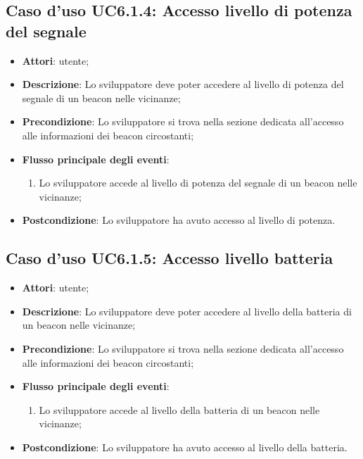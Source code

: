 \documentclass[../AnalisiDeiRequisiti.tex]{subfiles}
\begin{document}
\subsection{Caso d'uso UC6.1.4: Accesso livello di potenza del segnale}
\begin{itemize}
\item \textbf{Attori}: utente;
\item \textbf{Descrizione}: Lo sviluppatore deve poter accedere al livello di potenza del segnale di un beacon nelle vicinanze; 
      \item \textbf{Precondizione}: Lo sviluppatore si trova nella sezione dedicata all'accesso alle informazioni dei beacon circostanti;

        \item \textbf{Flusso principale degli eventi}:
          \begin{enumerate}
          \item Lo sviluppatore accede al livello di potenza del segnale di un beacon nelle vicinanze;

      \end{enumerate}
    \item \textbf{Postcondizione}: Lo sviluppatore ha avuto accesso al livello di potenza.
  \end{itemize}
\hypertarget{UC6.1.5}{}
\subsection{Caso d'uso UC6.1.5: Accesso livello batteria}

\begin{itemize}
\item \textbf{Attori}: utente;
\item \textbf{Descrizione}: Lo sviluppatore deve poter accedere al livello della batteria di un beacon nelle vicinanze; 
      \item \textbf{Precondizione}: Lo sviluppatore si trova nella sezione dedicata all'accesso alle informazioni dei beacon circostanti;

        \item \textbf{Flusso principale degli eventi}:
          \begin{enumerate}
          \item Lo sviluppatore accede al livello della batteria di un beacon nelle vicinanze;

      \end{enumerate}
    \item \textbf{Postcondizione}: Lo sviluppatore ha avuto accesso al livello della batteria.
  \end{itemize}
\hypertarget{UC6.1.6}{}
\end{document}
